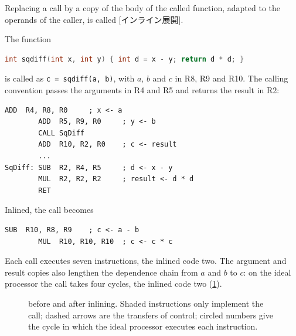 \documentclass[../main.tex]{subfiles}
\begin{document}
\begin{definition}
  \label{def:l10-inlining}
  Replacing a call by a copy of the body of the called function, adapted to
  the operands of the caller, is called [インライン展開].
\end{definition}

\begin{example}
  \label{ex:l10-inlining}
  The function
  \begin{lstlisting}[language=C, numbers=none]
int sqdiff(int x, int y) { int d = x - y; return d * d; }
\end{lstlisting}
  is called as \texttt{c = sqdiff(a, b)}, with $a$, $b$ and $c$ in R8, R9 and
  R10.  The calling convention passes the arguments in R4 and R5 and returns
  the result in R2:
  \begin{lstlisting}[language={[x86masm]Assembler}, numbers=none]
        ADD  R4, R8, R0     ; x <- a
        ADD  R5, R9, R0     ; y <- b
        CALL SqDiff
        ADD  R10, R2, R0    ; c <- result
        ...
SqDiff: SUB  R2, R4, R5     ; d <- x - y
        MUL  R2, R2, R2     ; result <- d * d
        RET
\end{lstlisting}
  Inlined, the call becomes
  \begin{lstlisting}[language={[x86masm]Assembler}, numbers=none]
        SUB  R10, R8, R9    ; c <- a - b
        MUL  R10, R10, R10  ; c <- c * c
\end{lstlisting}
  Each call executes seven instructions, the inlined code two.  The argument
  and result copies also lengthen the dependence chain from $a$ and $b$ to
  $c$: on the ideal processor the call takes four cycles, the inlined code two
  (\cref{fig:l10-inlining}).
\end{example}

\begin{figure}[htbp]
  \centering
  
  \caption{ before and after inlining.  Shaded
    instructions only implement the call; dashed arrows are the transfers of
    control; circled numbers give the cycle in which the ideal processor
    executes each instruction.}
  \label{fig:l10-inlining}
\end{figure}
\end{document}
